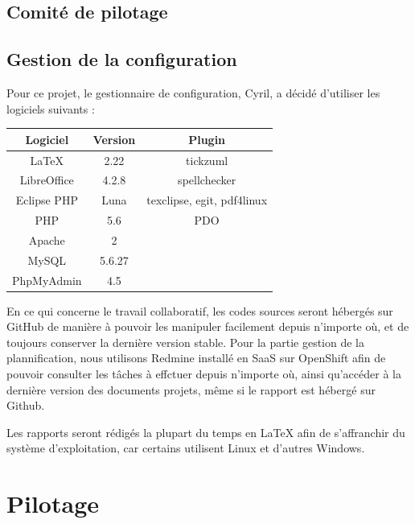\documentclass[11pt]{report}
\begin{document}
\subsection{Comité de pilotage}

\subsection{Gestion de la configuration}
Pour ce projet, le gestionnaire de configuration, Cyril, a décidé d'utiliser
les logiciels suivants : \\ 
\par 
\begin{tabular}{ | c | c | c | }
\hline 
   Logiciel & Version & Plugin  \\ \hline 
   LaTeX & 2.22 & tickzuml \\ \hline 
   LibreOffice & 4.2.8 & spellchecker \\ \hline 
   Eclipse PHP & Luna & texclipse, egit, pdf4linux \\ \hline
   PHP & 5.6 & PDO \\ \hline
   Apache & 2 & \\ \hline
   MySQL & 5.6.27 & \\ \hline
   PhpMyAdmin & 4.5 & \\ \hline
 \end{tabular}
 
 \par En ce qui concerne le travail collaboratif, les codes sources seront
 hébergés sur GitHub de manière à pouvoir les manipuler facilement depuis
 n'importe où, et de toujours conserver la dernière version stable. Pour la
 partie gestion de la plannification, nous utilisons Redmine installé en SaaS
 sur OpenShift afin de pouvoir consulter les tâches à effctuer depuis n'importe
 où, ainsi qu'accéder à la dernière version des documents projets, même si le
 rapport est hébergé sur Github.
 \par Les rapports seront rédigés la plupart du temps en LaTeX afin de
 s'affranchir du système d'exploitation, car certains utilisent Linux et
 d'autres Windows. 

\section{Pilotage}
\end{document}
